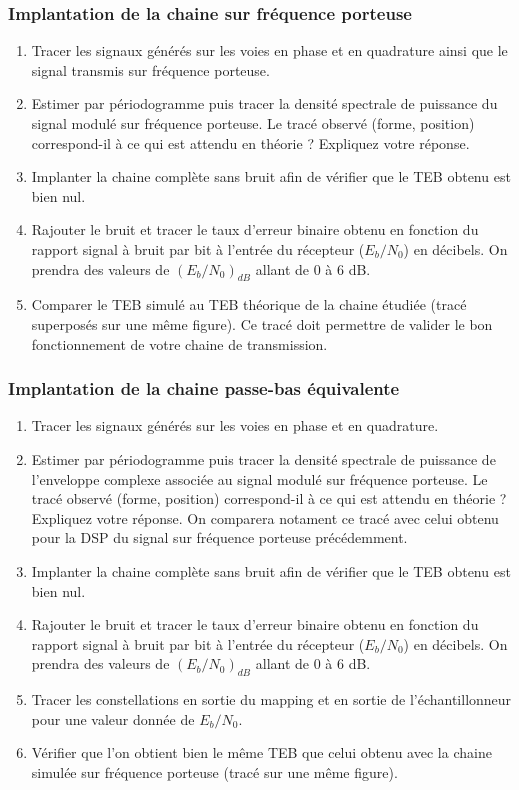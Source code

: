 \documentclass{article}
\begin{document}
\subsubsection{Implantation de la chaine sur fréquence porteuse}
\begin{enumerate}
    \item Tracer les signaux générés sur les voies en phase et en quadrature ainsi que le signal transmis sur fréquence porteuse.
    \item Estimer par périodogramme puis tracer la densité spectrale de puissance du signal modulé sur fréquence porteuse. Le tracé observé (forme, position) correspond-il à ce qui est attendu en théorie ? Expliquez votre réponse.
    \item Implanter la chaine complète sans bruit afin de vérifier que le TEB obtenu est bien nul.
    \item Rajouter le bruit et tracer le taux d'erreur binaire obtenu en fonction du rapport signal à bruit par bit à l'entrée du récepteur ($E_b/N_0$) en décibels. On prendra des valeurs de $\left(E_b/N_0\right)_{dB}$ allant de $0$ à $6$ dB.
    \item Comparer le TEB simulé au TEB théorique de la chaine étudiée (tracé superposés sur une même figure). Ce tracé doit permettre de valider le bon fonctionnement de votre chaine de transmission.
\end{enumerate}

\subsubsection{Implantation de la chaine passe-bas équivalente}
\begin{enumerate}
    \item Tracer les signaux générés sur les voies en phase et en quadrature.
    \item Estimer par périodogramme puis tracer la densité spectrale de puissance de l'enveloppe complexe associée au signal modulé sur fréquence porteuse. Le tracé observé (forme, position) correspond-il à ce qui est attendu en théorie ? Expliquez votre réponse. On comparera notament ce tracé avec celui obtenu pour la DSP du signal sur fréquence porteuse précédemment.
    \item Implanter la chaine complète sans bruit afin de vérifier que le TEB obtenu est bien nul.
    \item Rajouter le bruit et tracer le taux d'erreur binaire obtenu en fonction du rapport signal à bruit par bit à l'entrée du récepteur ($E_b/N_0$) en décibels. On prendra des valeurs de $\left(E_b/N_0\right)_{dB}$ allant de $0$ à $6$ dB.
    \item Tracer les constellations en sortie du mapping et en sortie de l'échantillonneur pour une valeur donnée de $E_b/N_0$.
    \item Vérifier que l'on obtient bien le même TEB que celui obtenu avec la chaine simulée sur fréquence porteuse (tracé sur une même figure).
\end{enumerate}
\end{document}
